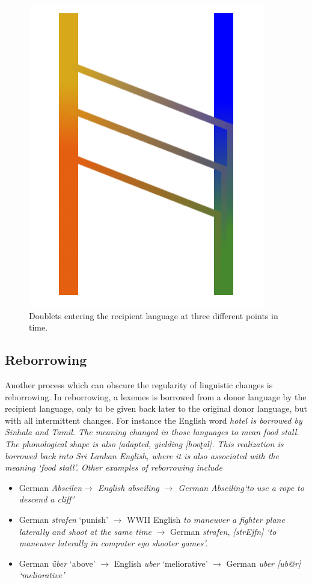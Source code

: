 \documentclass[a4paper,10pt]{article}
\newcommand{\phonet}[1]{[#1]}
\newcommand{\trs}[2]{\textit{#1} `#2'}
\newcommand{\tz}{ʈ}
\begin{document}
\begin{figure}
    \includegraphics[height=.3\textheight]{triplet.png}
\caption{Doublets entering the recipient language at three different points in time.}
\label{fig:doublets}
\end{figure}


\subsection{Reborrowing}
Another process which can obscure the regularity of linguistic changes is reborrowing. In reborrowing, a lexemes is borrowed from a donor language by the recipient language, only to be given back later to the original donor language, but with all intermittent changes. For instance the English word \em hotel \em is borrowed by Sinhala and Tamil. The meaning changed in those languages to mean \em food stall\em. The phonological shape is also |adapted, yielding \phonet{hoo{\tz}al}. This realization is borrowed back into Sri Lankan English, where it is also associated with the meaning `food stall'. Other examples of reborrowing include 

\begin{itemize}
 \item German \em Abseilen\em $\to$ English \em abseiling \em $\to$ German \em Abseiling\em `to use a rope to descend a cliff'
 \item German \trs{strafen}{punish} $\to$ WWII English {\em to maneuver a fighter plane laterally and shoot at the same time} $\to$ German \em strafen\em, \phonet{strEjfn} `to maneuver laterally in computer ego shooter games'.
 \item German \trs{\"uber}{above} $\to$ English \trs{uber}{meliorative} $\to$ German \em uber \em \phonet{ub@\;r} `meliorative'
\end{itemize}
\end{document}
